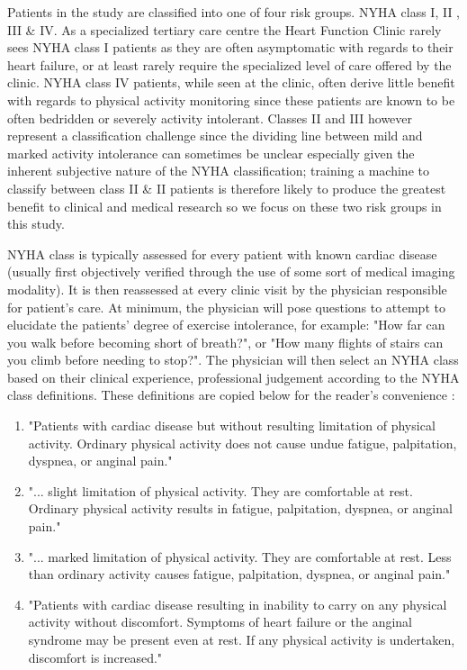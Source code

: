 \documentclass[]{article}
\begin{document}
Patients in the study are classified into one of four risk groups. NYHA class I, II , III \& IV. As a specialized tertiary care centre the Heart Function Clinic rarely sees NYHA class I patients as they are often asymptomatic with regards to their heart failure, or at least rarely require the specialized level of care offered by the clinic. NYHA class IV patients, while seen at the clinic, often derive little benefit with regards to physical activity monitoring since these patients are known to be often bedridden or severely activity intolerant. Classes II and III however represent a classification challenge since the dividing line between mild and marked activity intolerance can sometimes be unclear especially given the inherent subjective nature of the NYHA classification; training a machine to classify between class II \& II patients is therefore likely to produce the greatest benefit to clinical and medical research so we focus on these two risk groups in this study.

NYHA class is typically assessed for every patient with known cardiac disease (usually first objectively verified through the use of some sort of medical imaging modality). It is then reassessed at every clinic visit by the physician responsible for patient's care. At minimum, the physician will pose questions to attempt to elucidate the patients' degree of exercise intolerance, for example: "How far can you walk before becoming short of breath?", or "How many flights of stairs can you climb before needing to stop?". The physician will then select an NYHA class based on their clinical experience, professional judgement according to the NYHA class definitions. These definitions are copied below for the reader's convenience \cite{TheCriteriaCommitteeoftheNewYorkHeartAssociation1994}:
\begin{enumerate}[label=\Roman{*}:]
	\item "Patients with cardiac disease but without resulting limitation of physical activity. Ordinary physical activity does not cause undue fatigue, palpitation, dyspnea, or anginal pain."
	\item "... slight limitation of physical activity. They are comfortable at rest. Ordinary physical activity results in fatigue, palpitation, dyspnea, or anginal pain."
	\item "... marked limitation of physical activity. They are comfortable at rest. Less than ordinary activity causes fatigue, palpitation, dyspnea, or anginal pain."
	\item "Patients with cardiac disease resulting in inability to carry on any physical activity without discomfort. Symptoms of heart failure or the anginal syndrome may be present even at rest. If any physical activity is undertaken, discomfort is increased."
\end{enumerate}
\end{document}
